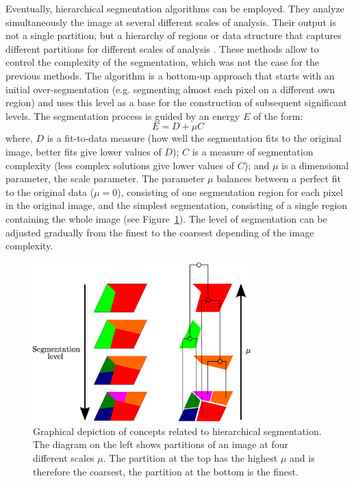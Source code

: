 Eventually, hierarchical segmentation algorithms can be employed. They analyze simultaneously the image at several different scales of analysis. Their output is not a single partition, but a hierarchy of regions or data structure that captures different partitions for different scales of analysis \citep{trias2006semi, guigues2006scale, baatz2004method}. These methods allow to control the complexity of the segmentation, which was not the case for the previous methods. The algorithm is a bottom-up approach that starts with an initial over-segmentation (e.g. segmenting almost each pixel on a different own region) and uses this level as a base for the construction of subsequent significant levels. The segmentation process is guided by an energy $E$ of the form:
\begin{equation}
E = D + \mu C
\end{equation}
where, $D$ is a fit-to-data measure (how well the segmentation fits to the original image, better fits give lower values of $D$); $C$ is a measure of segmentation complexity (less complex solutions give lower values of $C$); and $\mu$ is a dimensional parameter, the scale parameter. The parameter $\mu$ balances between a perfect fit to the original data ($\mu=0$), consisting of one segmentation region for each pixel in the original image, and the simplest segmentation, consisting of a single region containing the whole image \citep{guigues2006scale} (see Figure~\ref{fig:seg_hierar}). The level of segmentation can be adjusted gradually from the finest to the coarsest depending of the image complexity.

\begin{figure}[htbp]
\begin{center}
\includegraphics[width=0.75\textwidth]{Figures/seg_hierar}
\caption{Graphical depiction of concepts related to hierarchical segmentation. The diagram on the left shows partitions of an image at four different scales $\mu$. The partition at the top has the highest $\mu$ and is therefore the coarsest, the partition at the bottom is the finest.}
\label{fig:seg_hierar}
\end{center}
\end{figure}

